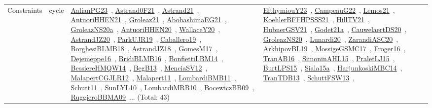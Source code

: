 {\begin{longtable}{lp{3cm}>{\raggedright\arraybackslash}p{6cm}>{\raggedright\arraybackslash}p{6cm}>{\raggedright\arraybackslash}p{8cm}}
Constraints & cycle & \href{works/AalianPG23.pdf}{AalianPG23}~\cite{AalianPG23}, \href{works/Astrand0F21.pdf}{Astrand0F21}~\cite{Astrand0F21}, \href{works/Astrand21.pdf}{Astrand21}~\cite{Astrand21}, \href{works/AntuoriHHEN21.pdf}{AntuoriHHEN21}~\cite{AntuoriHHEN21}, \href{works/Groleaz21.pdf}{Groleaz21}~\cite{Groleaz21}, \href{works/AbohashimaEG21.pdf}{AbohashimaEG21}~\cite{AbohashimaEG21}, \href{works/GroleazNS20a.pdf}{GroleazNS20a}~\cite{GroleazNS20a}, \href{works/AntuoriHHEN20.pdf}{AntuoriHHEN20}~\cite{AntuoriHHEN20}, \href{works/WallaceY20.pdf}{WallaceY20}~\cite{WallaceY20}, \href{works/AstrandJZ20.pdf}{AstrandJZ20}~\cite{AstrandJZ20}, \href{works/ParkUJR19.pdf}{ParkUJR19}~\cite{ParkUJR19}, \href{works/Caballero19.pdf}{Caballero19}~\cite{Caballero19}, \href{works/BorghesiBLMB18.pdf}{BorghesiBLMB18}~\cite{BorghesiBLMB18}, \href{works/AstrandJZ18.pdf}{AstrandJZ18}~\cite{AstrandJZ18}, \href{works/GomesM17.pdf}{GomesM17}~\cite{GomesM17}, \href{works/Dejemeppe16.pdf}{Dejemeppe16}~\cite{Dejemeppe16}, \href{works/BridiBLMB16.pdf}{BridiBLMB16}~\cite{BridiBLMB16}, \href{works/BonfiettiLBM14.pdf}{BonfiettiLBM14}~\cite{BonfiettiLBM14}, \href{works/BessiereHMQW14.pdf}{BessiereHMQW14}~\cite{BessiereHMQW14}, \href{works/BegB13.pdf}{BegB13}~\cite{BegB13}, \href{works/MenciaSV12.pdf}{MenciaSV12}~\cite{MenciaSV12}, \href{works/MalapertCGJLR12.pdf}{MalapertCGJLR12}~\cite{MalapertCGJLR12}, \href{works/Malapert11.pdf}{Malapert11}~\cite{Malapert11}, \href{works/LombardiBMB11.pdf}{LombardiBMB11}~\cite{LombardiBMB11}, \href{works/Schutt11.pdf}{Schutt11}~\cite{Schutt11}, \href{works/SunLYL10.pdf}{SunLYL10}~\cite{SunLYL10}, \href{works/LombardiMRB10.pdf}{LombardiMRB10}~\cite{LombardiMRB10}, \href{works/BocewiczBB09.pdf}{BocewiczBB09}~\cite{BocewiczBB09}, \href{works/RuggieroBBMA09.pdf}{RuggieroBBMA09}~\cite{RuggieroBBMA09}... (Total: 43) & \href{works/EfthymiouY23.pdf}{EfthymiouY23}~\cite{EfthymiouY23}, \href{works/CampeauG22.pdf}{CampeauG22}~\cite{CampeauG22}, \href{works/Lemos21.pdf}{Lemos21}~\cite{Lemos21}, \href{works/KoehlerBFFHPSSS21.pdf}{KoehlerBFFHPSSS21}~\cite{KoehlerBFFHPSSS21}, \href{works/HillTV21.pdf}{HillTV21}~\cite{HillTV21}, \href{works/HubnerGSV21.pdf}{HubnerGSV21}~\cite{HubnerGSV21}, \href{works/Godet21a.pdf}{Godet21a}~\cite{Godet21a}, \href{works/CauwelaertDS20.pdf}{CauwelaertDS20}~\cite{CauwelaertDS20}, \href{works/GroleazNS20.pdf}{GroleazNS20}~\cite{GroleazNS20}, \href{works/Lunardi20.pdf}{Lunardi20}~\cite{Lunardi20}, \href{works/ZarandiASC20.pdf}{ZarandiASC20}~\cite{ZarandiASC20}, \href{works/ArkhipovBL19.pdf}{ArkhipovBL19}~\cite{ArkhipovBL19}, \href{works/MossigeGSMC17.pdf}{MossigeGSMC17}~\cite{MossigeGSMC17}, \href{works/Froger16.pdf}{Froger16}~\cite{Froger16}, \href{works/TranAB16.pdf}{TranAB16}~\cite{TranAB16}, \href{works/SimoninAHL15.pdf}{SimoninAHL15}~\cite{SimoninAHL15}, \href{works/PraletLJ15.pdf}{PraletLJ15}~\cite{PraletLJ15}, \href{works/BurtLPS15.pdf}{BurtLPS15}~\cite{BurtLPS15}, \href{works/Siala15a.pdf}{Siala15a}~\cite{Siala15a}, \href{works/HarjunkoskiMBC14.pdf}{HarjunkoskiMBC14}~\cite{HarjunkoskiMBC14}, \href{works/TranTDB13.pdf}{TranTDB13}~\cite{TranTDB13}, \href{works/SchuttFSW13.pdf}{SchuttFSW13}~\cite{SchuttFSW13}, 
\end{longtable}}
